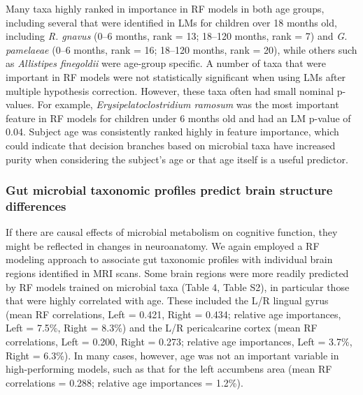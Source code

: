 \documentclass{article}
\begin{document}
Many taxa highly ranked in importance in RF models in both age
groups, including several that were identified in LMs for children over
18 months old, including \emph{R. gnavus} (0--6 months, rank = 13;
18--120 months, rank = 7) and \emph{G. pamelaeae} (0--6 months, rank =
16; 18--120 months, rank = 20), while others such as \emph{Allistipes
finegoldii} were age-group specific. A number of taxa that were important in RF models
were not statistically significant when using LMs after
multiple hypothesis correction. However, these taxa often had small nominal
p-values. For example, \emph{Erysipelatoclostridium ramosum} was the
most important feature in RF models for children under 6 months old and
had an LM p-value of 0.04. Subject age was consistently ranked highly in
feature importance, which could indicate that decision branches based on
microbial taxa have increased purity when considering the subject's age
or that age itself is a useful predictor.

\subsubsection*{Gut microbial taxonomic profiles predict brain structure differences}

If there are causal effects of microbial metabolism on cognitive
function, they might be reflected in changes in neuroanatomy. We again
employed a RF modeling approach to associate gut taxonomic
profiles with individual brain regions identified in MRI scans.
Some brain regions were more readily
predicted by RF models trained on microbial taxa (Table 4, Table S2), in particular those that were highly correlated with age.
These included the L/R lingual gyrus (mean RF correlations, Left =
0.421, Right = 0.434; relative age importances, Left = 7.5\%, Right =
8.3\%) and the L/R pericalcarine cortex (mean RF correlations, Left =
0.200, Right = 0.273; relative age importances, Left = 3.7\%, Right =
6.3\%). In many cases, however, age was not an important variable in
high-performing models, such as that for the left accumbens area (mean
RF correlations = 0.288; relative age importances = 1.2\%).
\end{document}
